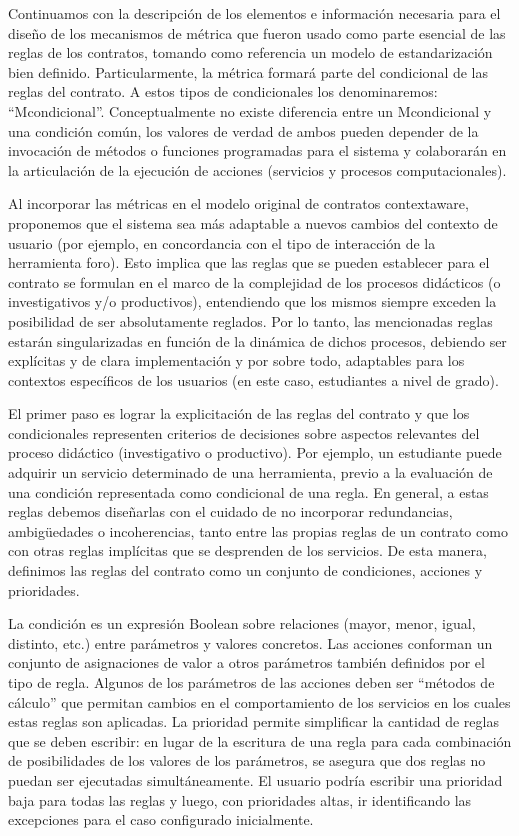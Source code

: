 Continuamos con la descripción de los elementos e información necesaria para el diseño de los mecanismos de métrica que fueron usado como parte esencial de las reglas de los contratos, tomando como referencia un modelo de estandarización bien definido. Particularmente, la métrica formará parte del
condicional de las reglas del contrato. A estos tipos de condicionales los denominaremos:
“Mcondicional”. Conceptualmente no existe diferencia entre un Mcondicional y una
condición común, los valores de verdad de ambos pueden depender de la invocación
de métodos o funciones programadas para el sistema y colaborarán en la
articulación de la ejecución de acciones (servicios y procesos computacionales).

Al incorporar las métricas en el modelo original de contratos contextaware,
proponemos que el sistema sea más adaptable a nuevos cambios del contexto de
usuario (por ejemplo, en concordancia con el tipo de interacción de la
herramienta foro). Esto implica que las reglas que se pueden establecer
para el contrato se formulan en el marco de la complejidad de los procesos
didácticos (o investigativos y/o productivos), entendiendo que los mismos
siempre exceden la posibilidad de ser absolutamente reglados. Por lo tanto, las
mencionadas reglas estarán singularizadas en función de la dinámica de dichos
procesos, debiendo ser explícitas y de clara implementación y por sobre todo,
adaptables para los contextos específicos de los usuarios (en este caso, estudiantes
a nivel de grado).

El primer paso es lograr la explicitación de las reglas del contrato y que
los condicionales representen criterios de decisiones sobre aspectos relevantes
del proceso didáctico (investigativo o productivo). Por ejemplo, un estudiante
puede adquirir un servicio determinado de una herramienta, previo a la
evaluación de una condición representada como condicional de una regla.
En general, a estas reglas debemos diseñarlas con el cuidado de no incorporar
redundancias, ambigüedades o incoherencias, tanto entre las propias
reglas de un contrato como con otras reglas implícitas que se desprenden de
los servicios. De esta manera, definimos las reglas del contrato como un conjunto
de condiciones, acciones y prioridades.

La condición es un expresión Boolean sobre relaciones (mayor, menor,
igual, distinto, etc.) entre parámetros y valores concretos.
Las acciones conforman un conjunto de asignaciones de valor a otros parámetros
también definidos por el tipo de regla. Algunos de los parámetros de
las acciones deben ser “métodos de cálculo” que permitan cambios en el comportamiento
de los servicios en los cuales estas reglas son aplicadas.
La prioridad permite simplificar la cantidad de reglas que se deben escribir:
en lugar de la escritura de una regla para cada combinación de posibilidades
de los valores de los parámetros, se asegura que dos reglas no puedan ser
ejecutadas simultáneamente. El usuario podría escribir una prioridad baja para
todas las reglas y luego, con prioridades altas, ir identificando las excepciones
para el caso configurado inicialmente.

